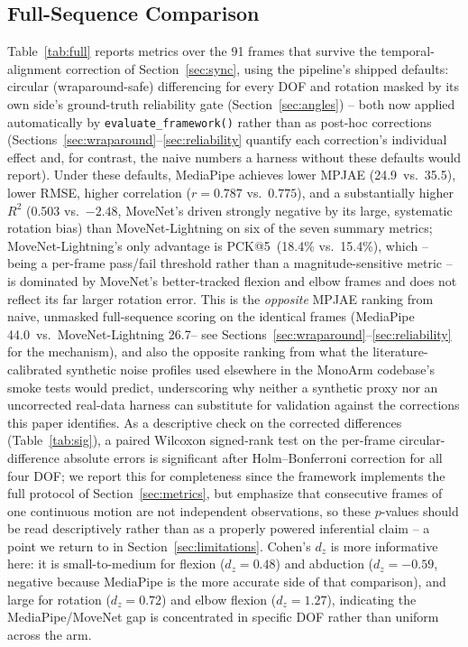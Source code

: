 \documentclass[conference]{IEEEtran}
\begin{document}
\subsection{Full-Sequence Comparison}
Table~\ref{tab:full} reports metrics over the 91 frames that survive the
temporal-alignment correction of Section~\ref{sec:sync}, using the
pipeline's shipped defaults: circular (wraparound-safe) differencing for
every DOF and rotation masked by its own side's ground-truth reliability
gate (Section~\ref{sec:angles}) -- both now applied automatically by
\texttt{evaluate\_framework()} rather than as post-hoc corrections
(Sections~\ref{sec:wraparound}--\ref{sec:reliability} quantify each
correction's individual effect and, for contrast, the naive numbers a
harness without these defaults would report). Under these defaults,
MediaPipe achieves lower MPJAE (24.9\textdegree\ vs.\ 35.5\textdegree),
lower RMSE, higher correlation ($r=0.787$ vs.\ $0.775$), and a
substantially higher $R^2$ (0.503 vs.\ $-2.48$, MoveNet's driven strongly
negative by its large, systematic rotation bias) than MoveNet-Lightning
on six of the seven summary metrics; MoveNet-Lightning's only
advantage is PCK@5\textdegree\ (18.4\% vs.\ 15.4\%), which -- being a
per-frame pass/fail threshold rather than a magnitude-sensitive
metric -- is dominated by MoveNet's better-tracked flexion and elbow
frames and does not reflect its far larger rotation error. This is the
\emph{opposite} MPJAE ranking from naive, unmasked full-sequence scoring
on the identical frames (MediaPipe 44.0\textdegree\ vs.\
MoveNet-Lightning 26.7\textdegree -- see
Sections~\ref{sec:wraparound}--\ref{sec:reliability} for the mechanism),
and also the opposite ranking from what the literature-calibrated
synthetic noise profiles used elsewhere in the MonoArm codebase's smoke
tests would predict, underscoring why neither a synthetic proxy nor an
uncorrected real-data harness can substitute for validation against the
corrections this paper identifies. As a descriptive check on the
corrected differences (Table~\ref{tab:sig}), a paired Wilcoxon
signed-rank test on the per-frame circular-difference absolute errors is
significant after Holm--Bonferroni correction for all four DOF; we
report this for completeness since the framework implements the full
protocol of Section~\ref{sec:metrics}, but emphasize that consecutive
frames of one continuous motion are not independent observations, so
these $p$-values should be read descriptively rather than as a properly
powered inferential claim -- a point we return to in
Section~\ref{sec:limitations}. Cohen's $d_z$ is more informative here:
it is small-to-medium for flexion ($d_z=0.48$) and abduction
($d_z=-0.59$, negative because MediaPipe is the more accurate side of
that comparison), and large for rotation ($d_z=0.72$) and elbow flexion
($d_z=1.27$), indicating the MediaPipe/MoveNet gap is concentrated in
specific DOF rather than uniform across the arm.
\end{document}
